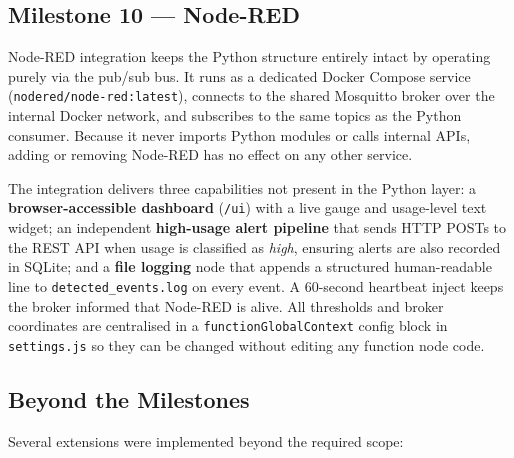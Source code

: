 \documentclass[10pt,a4paper]{article}
\begin{document}
\subsection{Milestone 10 --- Node-RED}

Node-RED integration keeps the Python structure entirely intact by operating purely via the pub/sub bus. It runs as a dedicated Docker Compose service (\texttt{nodered/node-red:latest}), connects to the shared Mosquitto broker over the internal Docker network, and subscribes to the same topics as the Python consumer. Because it never imports Python modules or calls internal APIs, adding or removing Node-RED has no effect on any other service.

The integration delivers three capabilities not present in the Python layer: a \textbf{browser-accessible dashboard} (\texttt{/ui}) with a live gauge and usage-level text widget; an independent \textbf{high-usage alert pipeline} that sends HTTP POSTs to the REST API when usage is classified as \textit{high}, ensuring alerts are also recorded in SQLite; and a \textbf{file logging} node that appends a structured human-readable line to \texttt{detected\_events.log} on every event. A 60-second heartbeat inject keeps the broker informed that Node-RED is alive. All thresholds and broker coordinates are centralised in a \texttt{functionGlobalContext} config block in \texttt{settings.js} so they can be changed without editing any function node code.

\subsection{Beyond the Milestones}

Several extensions were implemented beyond the required scope:
\end{document}
